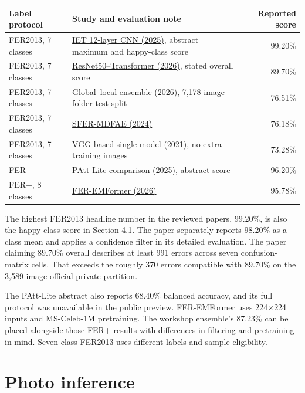 \documentclass[10pt,letterpaper]{article}
\newcommand{\metric}[1]{#1\%}
\newcommand{\sizepx}[1]{#1\ensuremath{\times}#1}
\begin{document}
{\small
\begin{tabularx}{\textwidth}{@{}lYr@{}}
\toprule
Label protocol & Study and evaluation note & Reported score\\
\midrule
FER2013, 7 classes & \href{https://ietresearch.onlinelibrary.wiley.com/doi/full/10.1049/cdt2/1845378}{IET 12-layer CNN (2025)}, abstract maximum and happy-class score & 99.20\%\\
FER2013, 7 classes & \href{https://link.springer.com/article/10.1007/s10791-026-10715-8}{ResNet50--Transformer (2026)}, stated overall score & 89.70\%\\
FER2013, 7 classes & \href{https://www.mdpi.com/2078-2489/17/10/982}{Global--local ensemble (2026)}, 7,178-image folder test split & 76.51\%\\
FER2013, 7 classes & \href{https://pmc.ncbi.nlm.nih.gov/articles/PMC11511472/}{SFER-MDFAE (2024)} & 76.18\%\\
FER2013, 7 classes & \href{https://arxiv.org/abs/2105.03588}{VGG-based single model (2021)}, no extra training images & 73.28\%\\
FER+ & \href{https://link.springer.com/chapter/10.1007/978-981-96-5887-9_18}{PAtt-Lite comparison (2025)}, abstract score & 96.20\%\\
FER+, 8 classes & \href{https://link.springer.com/article/10.1007/s44443-026-00740-4}{FER-EMFormer (2026)} & 95.78\%\\
\bottomrule
\end{tabularx}\par}

The highest FER2013 headline number in the reviewed papers, \metric{99.20}, is also the happy-class score in Section 4.1. The paper separately reports \metric{98.20} as a class mean and applies a confidence filter in its detailed evaluation. The paper claiming \metric{89.70} overall describes at least 991 errors across seven confusion-matrix cells. That exceeds the roughly 370 errors compatible with \metric{89.70} on the 3,589-image official private partition.

The PAtt-Lite abstract also reports \metric{68.40} balanced accuracy, and its full protocol was unavailable in the public preview. FER-EMFormer uses \sizepx{224} inputs and MS-Celeb-1M pretraining. The workshop ensemble's \metric{87.23} can be placed alongside those FER+ results with differences in filtering and pretraining in mind. Seven-class FER2013 uses different labels and sample eligibility.

\section{Photo inference}
\end{document}
